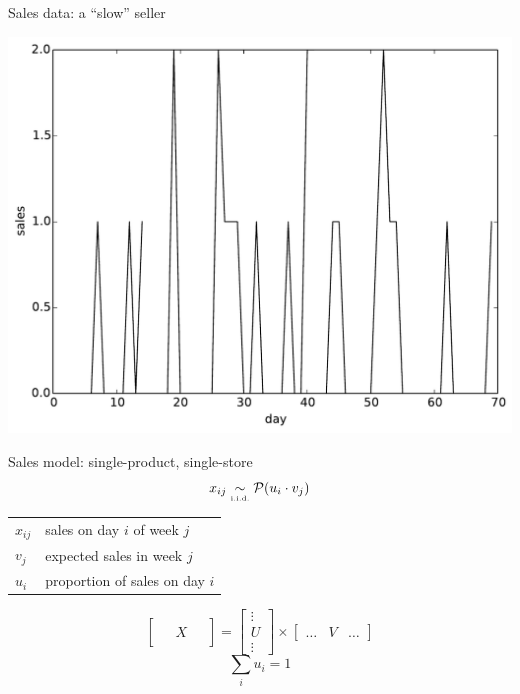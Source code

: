 \documentclass{beamer}
\begin{document}
\begin{frame}{Sales data: a ``slow'' seller}
  \begin{center}
  \includegraphics[width=0.8\columnwidth]{slow_seller.pdf}
 \end{center}
\end{frame}

\begin{frame}{Sales model: single-product, single-store}
 \begin{equation}
  x_{ij} \underset{\text{\tiny i.i.d.}}{\sim} \mathcal{P}(u_i \cdot v_j)
 \end{equation}
 \begin{tabular}{ll}
  $x_{ij}$ & sales on day $i$ of week $j$ \\
  $v_j$    & expected sales in week $j$ \\
  $u_i$    & proportion of sales on day $i$
 \end{tabular}
 \begin{equation}
  \begin{bmatrix} \; & & \; \\ & X & \\ & & \end{bmatrix} = \begin{bmatrix} \vdots \\ U \\ \vdots \end{bmatrix} \times \begin{bmatrix} \hdots & V & \hdots \end{bmatrix}
 \end{equation}
 \begin{equation}
  \sum_i u_i = 1
 \end{equation}
\end{frame}
\end{document}
